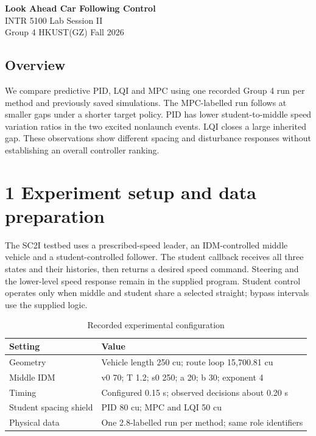 \documentclass[11pt,a4paper]{article}
\begin{document}
\begin{center}{\LARGE\bfseries Look Ahead Car Following Control}\\[5pt]

{\large INTR 5100 \quad Lab Session II}\\[5pt]Group 4 \quad HKUST(GZ) \quad Fall 2026\end{center}

\subsection*{Overview}

We compare predictive PID, LQI and MPC using one recorded Group 4 run per method and previously saved simulations. The MPC-labelled run follows at smaller gaps under a shorter target policy. PID has lower student-to-middle speed variation ratios in the two excited nonlaunch events. LQI closes a large inherited gap. These observations show different spacing and disturbance responses without establishing an overall controller ranking.


\section*{1 Experiment setup and data preparation}

The SC2I testbed uses a prescribed-speed leader, an IDM-controlled middle vehicle and a student-controlled follower. The student callback receives all three states and their histories, then returns a desired speed command. Steering and the lower-level speed response remain in the supplied program. Student control operates only when middle and student share a selected straight; bypass intervals use the supplied logic.


\begin{table}[H]\centering\small\caption{Recorded experimental configuration}
\begin{tabular}{ll}
\toprule
Setting & Value \\
\midrule

Geometry & Vehicle length 250 cu; route loop 15,700.81 cu \\

Middle IDM & v0 70; T 1.2; s0 250; a 20; b 30; exponent 4 \\

Timing & Configured 0.15 s; observed decisions about 0.20 s \\

Student spacing shield & PID 80 cu; MPC and LQI 50 cu \\

Physical data & One 2.8-labelled run per method; same role identifiers \\

\bottomrule\end{tabular}\end{table}
\end{document}
